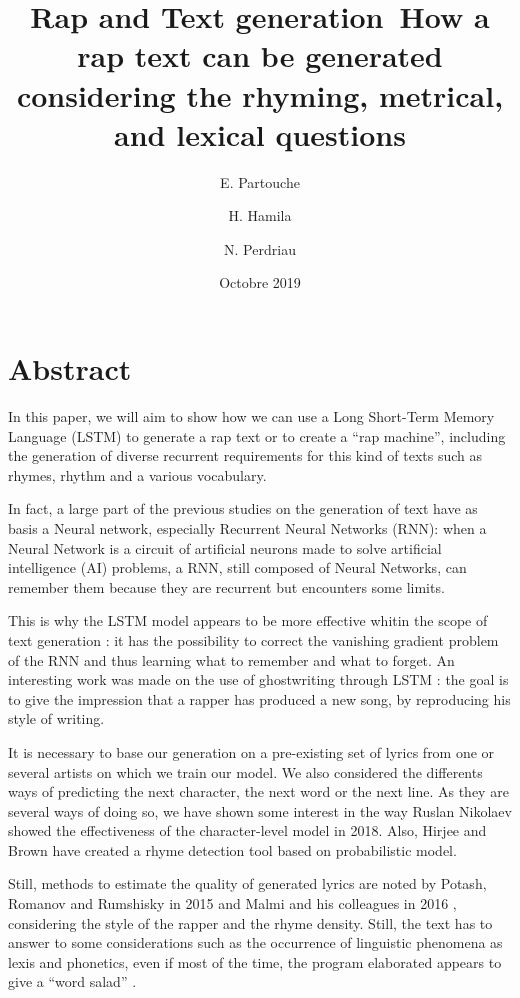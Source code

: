 \documentclass[12pt,a4paper]{article}
\title{Rap and Text generation\newline\ How a rap text can be generated considering the rhyming, metrical, and lexical questions}
\date{Octobre 2019}
\author{E. Partouche \and H. Hamila \and N. Perdriau}
\begin{document}
\maketitle
\tableofcontents
\newpage

\section{Abstract}

In this paper, we will aim to show how we can use a Long Short-Term Memory Language (LSTM) to generate a rap text or to create a “rap machine”, including the generation of diverse recurrent requirements for this kind of texts such as rhymes, rhythm and a various vocabulary. \newline

In fact, a large part of the previous studies on the generation of text \cite{sutskever_generating_nodate} have as basis a Neural network, especially Recurrent Neural Networks (RNN): when a Neural Network is a circuit of artificial neurons made to solve artificial intelligence (AI) problems, a RNN, still composed of Neural Networks, can remember them because they are recurrent but encounters some limits.\newline

This is why the LSTM model appears to be more effective whitin the scope of text generation : it has the possibility to correct the vanishing gradient problem of the RNN and thus learning what to remember and what to forget. An interesting work was made on the use of ghostwriting through LSTM  \cite{potash_ghostwriter:_2015} : the goal is to give the impression that a rapper has produced a new song, by reproducing his style of writing. \newline

It is necessary to base our generation on a pre-existing set of lyrics from one or several artists on which we train our model. We also considered the differents ways of predicting the next character, the next word or the next line. As they are several ways of doing so, we have shown some interest in the way Ruslan Nikolaev \cite{nikolaev_generating_2018} showed the effectiveness of the character-level model in 2018. Also, Hirjee and Brown have created a rhyme detection tool based on probabilistic model.\cite{hirjee_using_2010} \newline

Still, methods to estimate the quality of generated lyrics are noted by Potash, Romanov and Rumshisky in 2015 and Malmi and his colleagues in 2016 \cite{malmi_dopelearning:_2016}, considering the style of the rapper and the rhyme density. Still, the text has to answer to some considerations such as the occurrence of linguistic phenomena as lexis and phonetics, even if most of the time, the program elaborated appears to give a “word salad”   \cite{oliveira_automatic_nodate}. \newline
\end{document}
